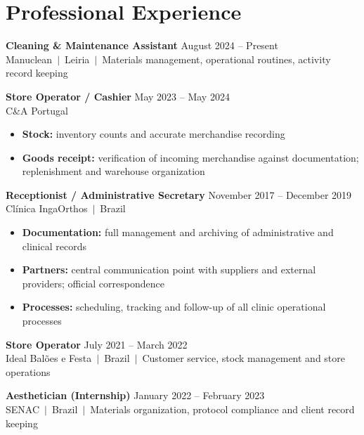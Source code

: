 \documentclass[10pt,a4paper]{article}
\begin{document}
\section{Professional Experience}

{\small\bfseries Cleaning \& Maintenance Assistant}\hfill{\small\color{subtle} August 2024 -- Present}\\
{\small\color{accent} Manuclean~$|$~Leiria}~{\small\color{subtle}$|$~Materials management, operational routines, activity record keeping}

\vspace{4pt}
{\small\bfseries Store Operator / Cashier}\hfill{\small\color{subtle} May 2023 -- May 2024}\\
{\small\color{accent} C\&A Portugal}
\begin{itemize}\small
  \item \textbf{Stock:} inventory counts and accurate merchandise recording
  \item \textbf{Goods receipt:} verification of incoming merchandise against documentation; replenishment and warehouse organization
\end{itemize}

\vspace{4pt}
{\small\bfseries Receptionist / Administrative Secretary}\hfill{\small\color{subtle} November 2017 -- December 2019}\\
{\small\color{accent} Clínica IngaOrthos~$|$~Brazil}
\begin{itemize}\small
  \item \textbf{Documentation:} full management and archiving of administrative and clinical records
  \item \textbf{Partners:} central communication point with suppliers and external providers; official correspondence
  \item \textbf{Processes:} scheduling, tracking and follow-up of all clinic operational processes
\end{itemize}

\vspace{4pt}
{\small\bfseries Store Operator}\hfill{\small\color{subtle} July 2021 -- March 2022}\\
{\small\color{accent} Ideal Balões e Festa~$|$~Brazil}~{\small\color{subtle}$|$~Customer service, stock management and store operations}

\vspace{4pt}
{\small\bfseries Aesthetician (Internship)}\hfill{\small\color{subtle} January 2022 -- February 2023}\\
{\small\color{accent} SENAC~$|$~Brazil}~{\small\color{subtle}$|$~Materials organization, protocol compliance and client record keeping}
\end{document}
